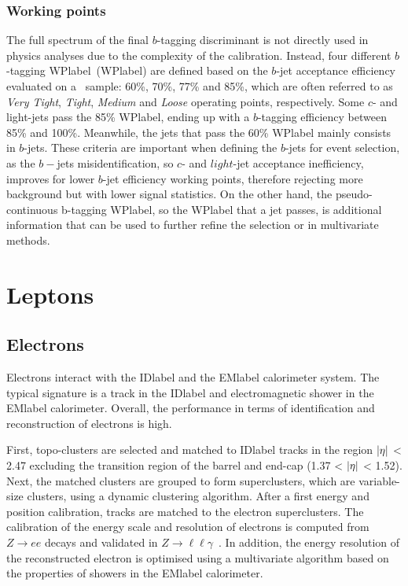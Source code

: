 \subsubsection{Working points}

The full spectrum of the final $b$-tagging discriminant is not directly used in physics analyses due to the complexity of the calibration. Instead, four different $b$-tagging \acrlong{WPlabel}~(\acrshort{WPlabel}) are defined based on the $b$-jet acceptance efficiency evaluated on a \ttbar\ sample: 60\%, 70\%, 77\% and 85\%, which are often referred to as \textit{Very Tight}, \textit{Tight}, \textit{Medium} and \textit{Loose} operating points, respectively. Some $c$- and light-jets pass the 85\% \acrshort{WPlabel}, ending up with a $b$-tagging efficiency between 85\% and 100\%. Meanwhile, the jets that pass the 60\% \acrshort{WPlabel} mainly consists in $b$-jets. These criteria are important when defining the $b$-jets for event selection, as the $b-$jets misidentification, so $c$- and $light$-jet acceptance inefficiency, improves for lower $b$-jet efficiency working points, therefore rejecting more background but with lower signal statistics. On the other hand, the pseudo-continuous b-tagging \acrshort{WPlabel}, so the \acrshort{WPlabel} that a jet passes, is additional information that can be used to further refine the selection or in multivariate methods.

\clearpage
\section{Leptons}

\subsection{Electrons}

Electrons interact with the \acrshort{IDlabel} and the \acrshort{EMlabel} calorimeter system. The typical signature is a track in the \acrshort{IDlabel} and electromagnetic shower in the \acrshort{EMlabel} calorimeter. Overall, the performance in terms of identification and reconstruction of electrons is high.

First, topo-clusters are selected and matched to \acrshort{IDlabel} tracks in the region $\abs{\eta}$ < 2.47 excluding the transition region of the barrel and end-cap (1.37 < $\abs{\eta}$ < 1.52). Next, the matched clusters are grouped to form superclusters, which are variable-size clusters, using a dynamic clustering algorithm. After a first energy and position calibration, tracks are matched to the electron superclusters. The calibration of the energy scale and resolution of electrons is computed from $Z\rightarrow ee$ decays and validated in $Z\rightarrow \ell\ell\gamma$~\cite{performanceEgamma}. In addition, the energy resolution of the reconstructed electron is optimised using a multivariate algorithm based on the properties of showers in the \acrshort{EMlabel} calorimeter.

